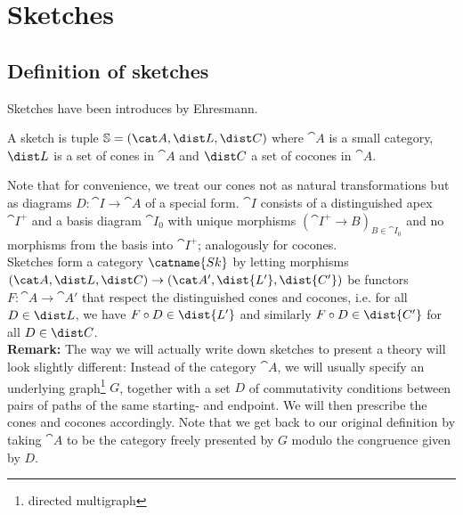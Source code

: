 \section{Sketches}
\label{sec:sketches}

\subsection{Definition of sketches}

Sketches have been introduces by Ehresmann. \\

\begin{Definition}[Sketch]
A sketch is tuple $\mathbb S = (\cat A, \dist L, \dist C)$ where $\cat A$ is a small category, $\dist L$ is a set of cones in $\cat A$ and $\dist C$ a set of cocones in $\cat A$.
\end{Definition}
Note that for convenience, we treat our cones not as natural transformations but as diagrams $D : \cat I \to \cat A$ of a special form. $\cat I$ consists of a distinguished apex $\cat I^+$ and a basis diagram $\cat I_0$ with unique morphisms $(\cat I^+ \to B)_{B \in \cat I_0}$ and no morphisms from the basis into $\cat I^+$; analogously for cocones. \\

Sketches form a category $\catname{Sk}$ by letting morphisms $(\cat A, \dist L, \dist C) \to (\cat A', \dist{L'}, \dist{C'})$ be functors $F : \cat A \to \cat A'$ that respect the distinguished cones and cocones, i.e. for all $D \in \dist L$, we have $F \circ D \in \dist{L'}$ and similarly $F \circ D \in \dist{C'}$ for all $D \in \dist C$. \\

\textbf{Remark: } The way we will actually write down sketches to present a theory will look slightly different: Instead of the category $\cat A$, we will usually specify an underlying graph\footnote{directed multigraph} $G$, together with a set $D$ of commutativity conditions between pairs of paths of the same starting- and endpoint. We will then prescribe the cones and cocones accordingly. Note that we get back to our original definition by taking $\cat A$ to be the category freely presented by $G$ modulo the congruence given by $D$. 

